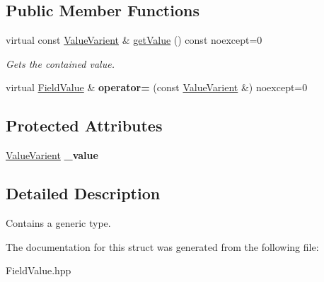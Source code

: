 \subsection*{Public Member Functions}
\begin{DoxyCompactItemize}
\item 
\mbox{\label{structZiApi_1_1FieldValue_ae142783211fc0a6dc13e8820c48bb57c}} 
virtual const \mbox{\hyperlink{structZiApi_1_1FieldValue_ad15b3d7fad80efab396843e70a5b1db2}{Value\+Varient}} \& \mbox{\hyperlink{structZiApi_1_1FieldValue_ae142783211fc0a6dc13e8820c48bb57c}{get\+Value}} () const noexcept=0
\begin{DoxyCompactList}\small\item\em Gets the contained value. \end{DoxyCompactList}\item 
\mbox{\label{structZiApi_1_1FieldValue_a78c42c7b9b8e87fb62ca5c1631837a30}} 
virtual \mbox{\hyperlink{structZiApi_1_1FieldValue}{Field\+Value}} \& {\bfseries operator=} (const \mbox{\hyperlink{structZiApi_1_1FieldValue_ad15b3d7fad80efab396843e70a5b1db2}{Value\+Varient}} \&) noexcept=0
\end{DoxyCompactItemize}
\subsection*{Protected Attributes}
\begin{DoxyCompactItemize}
\item 
\mbox{\label{structZiApi_1_1FieldValue_af89df27595513c982d191d0a84b8f12c}} 
\mbox{\hyperlink{structZiApi_1_1FieldValue_ad15b3d7fad80efab396843e70a5b1db2}{Value\+Varient}} {\bfseries \+\_\+value}
\end{DoxyCompactItemize}


\subsection{Detailed Description}
Contains a generic type. 

The documentation for this struct was generated from the following file\+:\begin{DoxyCompactItemize}
\item 
Field\+Value.\+hpp\end{DoxyCompactItemize}
